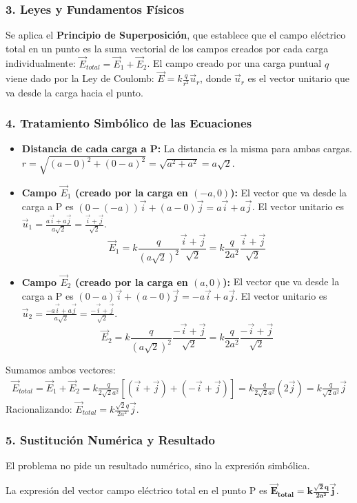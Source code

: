 \subsubsection*{3. Leyes y Fundamentos Físicos}
Se aplica el \textbf{Principio de Superposición}, que establece que el campo eléctrico total en un punto es la suma vectorial de los campos creados por cada carga individualmente: $\vec{E}_{total} = \vec{E}_1 + \vec{E}_2$.
El campo creado por una carga puntual $q$ viene dado por la Ley de Coulomb: $\vec{E} = k \frac{q}{r^2}\vec{u}_r$, donde $\vec{u}_r$ es el vector unitario que va desde la carga hacia el punto.

\subsubsection*{4. Tratamiento Simbólico de las Ecuaciones}
\begin{itemize}
    \item \textbf{Distancia de cada carga a P:} La distancia es la misma para ambas cargas. $r = \sqrt{(a-0)^2+(0-a)^2} = \sqrt{a^2+a^2} = a\sqrt{2}$.
    \item \textbf{Campo $\vec{E}_1$ (creado por la carga en $(-a,0)$):}
    El vector que va desde la carga a P es $(0-(-a))\vec{i} + (a-0)\vec{j} = a\vec{i}+a\vec{j}$.
    El vector unitario es $\vec{u}_1 = \frac{a\vec{i}+a\vec{j}}{a\sqrt{2}} = \frac{\vec{i}+\vec{j}}{\sqrt{2}}$.
    $$ \vec{E}_1 = k \frac{q}{(a\sqrt{2})^2} \frac{\vec{i}+\vec{j}}{\sqrt{2}} = k \frac{q}{2a^2} \frac{\vec{i}+\vec{j}}{\sqrt{2}} $$
    \item \textbf{Campo $\vec{E}_2$ (creado por la carga en $(a,0)$):}
    El vector que va desde la carga a P es $(0-a)\vec{i} + (a-0)\vec{j} = -a\vec{i}+a\vec{j}$.
    El vector unitario es $\vec{u}_2 = \frac{-a\vec{i}+a\vec{j}}{a\sqrt{2}} = \frac{-\vec{i}+\vec{j}}{\sqrt{2}}$.
    $$ \vec{E}_2 = k \frac{q}{(a\sqrt{2})^2} \frac{-\vec{i}+\vec{j}}{\sqrt{2}} = k \frac{q}{2a^2} \frac{-\vec{i}+\vec{j}}{\sqrt{2}} $$
\end{itemize}
Sumamos ambos vectores:
\begin{gather}
    \vec{E}_{total} = \vec{E}_1 + \vec{E}_2 = k \frac{q}{2\sqrt{2}a^2} [ (\vec{i}+\vec{j}) + (-\vec{i}+\vec{j}) ] = k \frac{q}{2\sqrt{2}a^2} (2\vec{j}) = k \frac{q}{\sqrt{2}a^2}\vec{j}
\end{gather}
Racionalizando: $\vec{E}_{total} = k \frac{\sqrt{2}q}{2a^2}\vec{j}$.

\subsubsection*{5. Sustitución Numérica y Resultado}
El problema no pide un resultado numérico, sino la expresión simbólica.
\begin{cajaresultado}
La expresión del vector campo eléctrico total en el punto P es $\boldsymbol{\vec{E}_{total} = k \frac{\sqrt{2}q}{2a^2}\vec{j}}$.
\end{cajaresultado}

